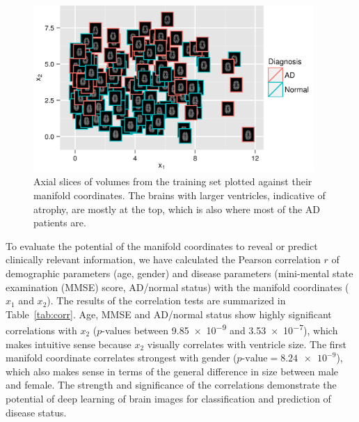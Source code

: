 \begin{figure}[tb!] \centering
\includegraphics[width=0.95\textwidth]{figures/MICCAI2013_scatter3}
\caption[Axial slices of volumes from the training set plotted against their
manifold coordinates]{Axial slices of volumes from the training set plotted
against their manifold coordinates. The brains with larger ventricles, indicative of atrophy,
are mostly at the top, which is also where most of the AD patients are.}
\label{fig:scatter}
\end{figure}

To evaluate the potential of the manifold coordinates to reveal or predict
clinically relevant information, we have calculated the Pearson correlation $r$
of demographic parameters (age, gender) and disease parameters (mini-mental
state examination (MMSE) score, AD/normal status) with the manifold coordinates
($x_1$ and $x_2$). The results of the correlation tests are summarized in
Table~\ref{tab:corr}. Age, MMSE and AD/normal status show highly significant
correlations with $x_2$ ($p$-values between \num{9.85e-9} and \num{3.53e-7}),
which makes intuitive sense because $x_2$ visually correlates with ventricle
size. The first manifold coordinate correlates strongest with gender
($p\text{-value} = \num{8.24e-9}$), which also makes sense in terms of the
general difference in size between male and female. The strength and
significance of the correlations demonstrate the potential of deep learning of
brain images for classification and prediction of disease status.

